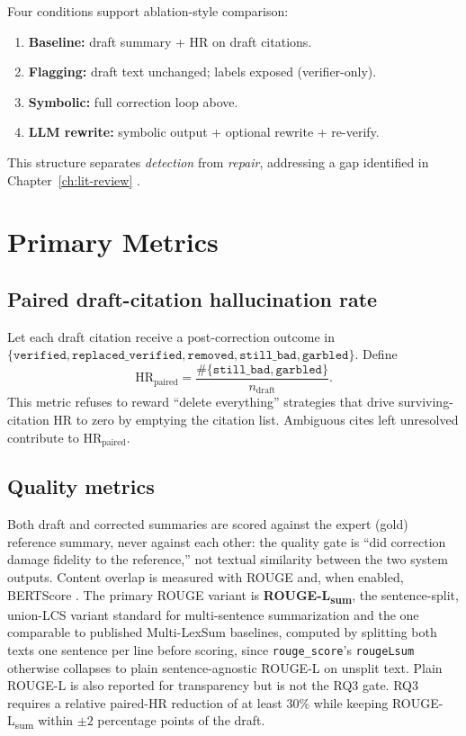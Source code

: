 Four conditions support ablation-style comparison:

\begin{enumerate}
  \item \textbf{Baseline:} draft summary + HR on draft citations.
  \item \textbf{Flagging:} draft text unchanged; labels exposed (verifier-only).
  \item \textbf{Symbolic:} full correction loop above.
  \item \textbf{LLM rewrite:} symbolic output + optional rewrite + re-verify.
\end{enumerate}

This structure separates \emph{detection} from \emph{repair}, addressing a gap identified in Chapter~\ref{ch:lit-review} \cite{noel2025hallugraph,manakul2023selfcheckgpt}.

\section{Primary Metrics}
\label{sec:method-metrics}

\subsection{Paired draft-citation hallucination rate}
Let each draft citation receive a post-correction outcome in $\{\texttt{verified},\texttt{replaced\_verified},\texttt{removed},\texttt{still\_bad},\texttt{garbled}\}$. Define
\[
\mathrm{HR}_{\mathrm{paired}} = \frac{\#\{\texttt{still\_bad},\texttt{garbled}\}}{n_{\mathrm{draft}}}.
\]
This metric refuses to reward ``delete everything'' strategies that drive surviving-citation HR to zero by emptying the citation list. Ambiguous cites left unresolved contribute to $\mathrm{HR}_{\mathrm{paired}}$.

\subsection{Quality metrics}
Both draft and corrected summaries are scored against the expert (gold) reference summary, never against each other: the quality gate is ``did correction damage fidelity to the reference,'' not textual similarity between the two system outputs. Content overlap is measured with ROUGE \cite{lin2004rouge} and, when enabled, BERTScore \cite{zhang2020bertscore}. The primary ROUGE variant is \textbf{ROUGE-L\textsubscript{sum}}, the sentence-split, union-LCS variant standard for multi-sentence summarization and the one comparable to published Multi-LexSum baselines, computed by splitting both texts one sentence per line before scoring, since \texttt{rouge\_score}'s \texttt{rougeLsum} otherwise collapses to plain sentence-agnostic ROUGE-L on unsplit text. Plain ROUGE-L is also reported for transparency but is not the RQ3 gate. RQ3 requires a relative paired-HR reduction of at least 30\% while keeping ROUGE-L\textsubscript{sum} within $\pm 2$ percentage points of the draft.

